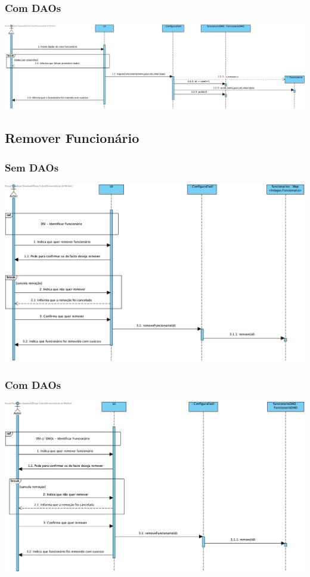 \subsubsection{Com DAOs}
\begin{center}
 	\includegraphics[width = 5.5in]{DSI_D/DSI-DAOs-Registar_Funcionario.jpg}
\end{center}


\subsection{Remover Funcionário}
\subsubsection{Sem DAOs}
\begin{center}
 	\includegraphics[width = 5.5in]{DSI/DSI-Remover_Funcionario.jpg}
\end{center}
\subsubsection{Com DAOs}
\begin{center}
 	\includegraphics[width = 5.5in]{DSI_D/DSI-DAOs-Remover_Funcionario.jpg}
\end{center}


